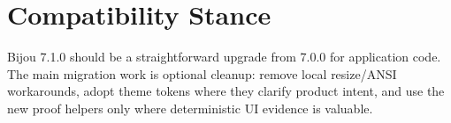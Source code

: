 \section{Compatibility Stance}\label{record-271-compatibility-stance}

Bijou 7.1.0 should be a straightforward upgrade from 7.0.0 for application code. The main migration work is optional cleanup: remove local resize/ANSI workarounds, adopt theme tokens where they clarify product intent, and use the new proof helpers only where deterministic UI evidence is valuable.


